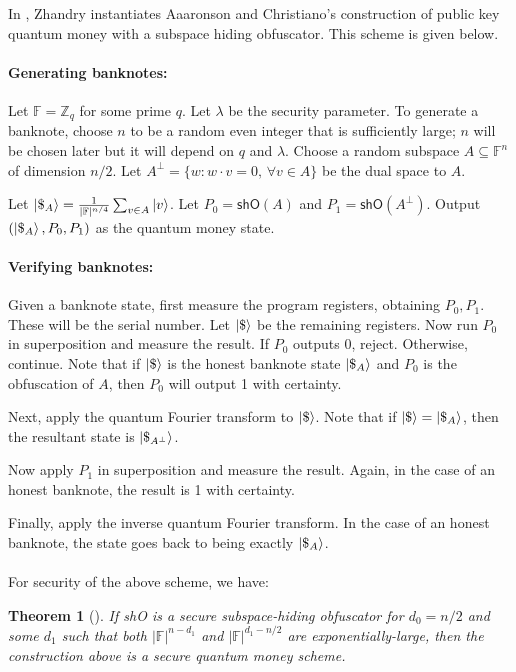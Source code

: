 \documentclass[12pt,letterpaper]{article}
\newtheorem{theorem}{Theorem}[section]
\theoremstyle{definition}
\theoremstyle{remark}
\begin{document}
In \cite{Zha19}, Zhandry instantiates Aaaronson and Christiano's \cite{AC12} construction of public key quantum money with a subspace hiding obfuscator. This scheme is given below.

\paragraph{Generating banknotes:} Let $\mathbb{F}=\mathbb{Z}_q$ for some prime $q$. Let $\lambda$ be the security parameter. To generate a banknote, choose $n$ to be a random even integer that is sufficiently large; $n$ will be chosen later but it will depend on $q$ and $\lambda$. Choose a random subspace $A \subseteq \mathbb{F}^n$ of dimension $n/2$. Let $A^{\perp}=\{w: w\cdot v=0, \, \forall v \in A\}$ be the dual space to $A$.

Let $\ket{\$_A}=\frac{1}{|\mathbb{F}|^{n/4}}\sum_{v \in A} \ket{v}$. Let $P_0 = \textsf{shO}(A)$ and $P_1 = \textsf{shO}(A^{\perp})$. Output $(\ket{\$_A}, P_0, P_1)$ as the quantum money state.

\paragraph{Verifying banknotes:} Given a banknote state, first measure the program registers, obtaining $P_0, P_1$. These will be the serial number. Let $\ket{\$}$ be the remaining registers. 
Now run $P_0$ in superposition and measure the result. If $P_0$ outputs 0, reject. Otherwise, continue. Note that if $\ket{\$}$ is the honest banknote state $\ket{\$_A}$ and $P_0$ is the obfuscation of $A$, then $P_0$ will output 1 with certainty.

Next, apply the quantum Fourier transform to $\ket{\$}$. Note that if $\ket{\$}=\ket{\$_A}$, then the resultant state is $\ket{\$_{A^\perp}}$.

Now apply $P_1$ in superposition and measure the result. Again, in the case of an honest banknote, the result is 1 with certainty.

Finally, apply the inverse quantum Fourier transform. In the case of an honest banknote, the state goes back to being exactly $\ket{\$_A}$.

\paragraph{}
For security of the above scheme, we have:

\begin{theorem}[\cite{Zha19}]
    If \textsf{shO} is a secure subspace-hiding obfuscator for $d_0=n/2$ and some $d_1$ such that both $|\mathbb{F}|^{n-d_1}$ and $|\mathbb{F}|^{d_1-n/2}$ are exponentially-large, then the construction above is a secure quantum money scheme.
\end{theorem}
\end{document}
